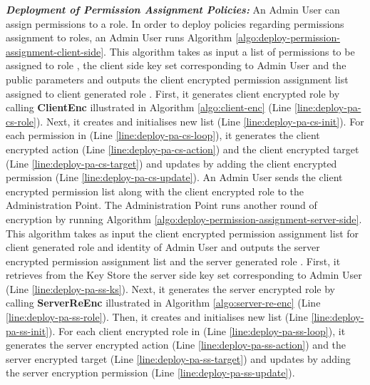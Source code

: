 \documentclass[final,5p,times,twocolumn]{elsarticle}
\begin{document}
\emph{\textbf{Deployment of Permission Assignment Policies:}} 
An Admin User can assign permissions to a role. In order to deploy policies regarding permissions assignment to roles, an Admin User runs Algorithm \ref{algo:deploy-permission-assignment-client-side}. This algorithm takes as input a list of permissions  to be assigned to role , the client side key set  corresponding to Admin User  and the public parameters  and outputs the client encrypted permission assignment list  assigned to client generated role . First, it generates client encrypted role  by calling \textbf{ClientEnc} illustrated in Algorithm \ref{algo:client-enc} (Line \ref{line:deploy-pa-cs-role}). Next, it creates and initialises new list  (Line \ref{line:deploy-pa-cs-init}). For each permission in  (Line \ref{line:deploy-pa-cs-loop}), it generates the client encrypted action  (Line \ref{line:deploy-pa-cs-action}) and the client encrypted target  (Line \ref{line:deploy-pa-cs-target}) and updates  by adding the client encrypted permission (Line \ref{line:deploy-pa-cs-update}). An Admin User sends the client encrypted permission list along with the client encrypted role to the Administration Point. 
The Administration Point runs another round of encryption by running Algorithm \ref{algo:deploy-permission-assignment-server-side}. This algorithm takes as input the client encrypted permission assignment list  for client generated role  and identity  of Admin User and outputs the server encrypted permission assignment list  and the server generated role . First, it retrieves from the Key Store the server side key set  corresponding to Admin User  (Line \ref{line:deploy-pa-ss-ks}). Next, it generates the server encrypted role by calling \textbf{ServerReEnc} illustrated in Algorithm \ref{algo:server-re-enc} (Line \ref{line:deploy-pa-ss-role}). Then, it creates and initialises new list  (Line \ref{line:deploy-pa-ss-init}). For each client encrypted role in  (Line \ref{line:deploy-pa-ss-loop}), it generates the server encrypted action (Line \ref{line:deploy-pa-ss-action}) and the server encrypted target (Line \ref{line:deploy-pa-ss-target}) and updates  by adding the server encryption permission (Line \ref{line:deploy-pa-ss-update}).
\end{document}
